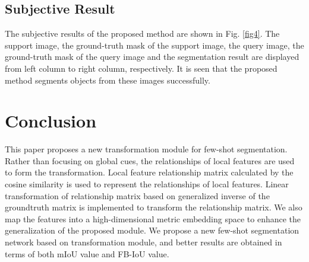 \documentclass[runningheads]{llncs}
\begin{document}
\subsection{Subjective Result}
The subjective results of the proposed method are shown in Fig. \ref{fig4}. The support image, the ground-truth mask of the support image, the query image, the ground-truth mask of the query image and the segmentation result are displayed from left column to right column, respectively.  It is seen that the proposed method segments objects from these images successfully.

\section{Conclusion}
This paper proposes a new transformation module for few-shot segmentation. Rather than focusing on global cues, the relationships of local features are used to form the transformation. Local feature relationship matrix calculated by the cosine similarity is used to represent the relationships of local features. Linear transformation of relationship matrix based on generalized inverse of the groundtruth matrix is implemented to transform the relationship matrix. We also map the features into a high-dimensional metric embedding space to enhance the generalization of the proposed module. We propose a new few-shot segmentation network based on transformation module, and better results are obtained in terms of both mIoU value and FB-IoU value.
\end{document}
